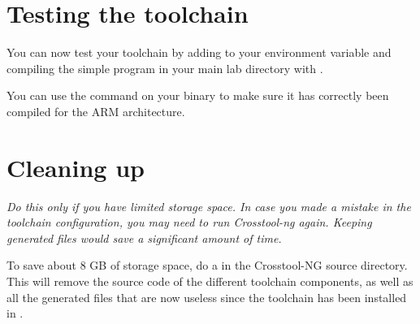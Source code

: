 \section{Testing the toolchain}

You can now test your toolchain by adding
 to your
 environment variable and compiling the simple
 program in your main lab directory with
.

You can use the  command on your binary to make sure it has
correctly been compiled for the ARM architecture.

\section{Cleaning up}

{\em Do this only if you have limited storage space. In case you made a
mistake in the toolchain configuration, you may need to run Crosstool-ng
again. Keeping generated files would save a significant amount of time.}

To save about 8 GB of storage space, do a  in the
Crosstool-NG source directory. This will remove the source code of the
different toolchain components, as well as all the generated files
that are now useless since the toolchain has been installed in
.

